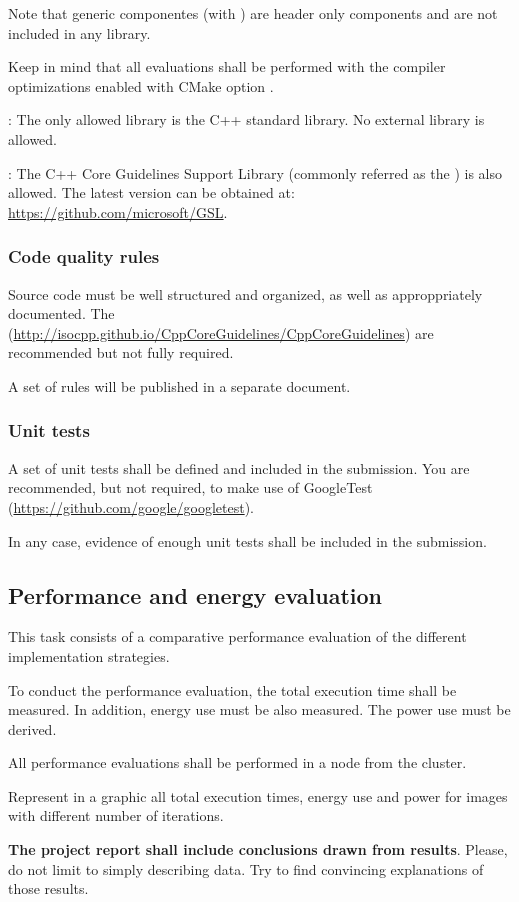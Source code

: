 Note that generic componentes (with ) are header only components and
are not included in any library.

Keep in mind that all evaluations shall be performed with the compiler optimizations
enabled with CMake option
.

: 
The only allowed library is the C++ standard library.
No external library is allowed.

: The C++ Core Guidelines Support Library (commonly referred as
the ) is also allowed. The latest version can be obtained at:
\url{https://github.com/microsoft/GSL}.

\subsubsection{Code quality rules}

Source code must be well structured and organized, 
as well as approppriately documented.
The 
(\url{http://isocpp.github.io/CppCoreGuidelines/CppCoreGuidelines})
are recommended but not fully required.

A set of rules will be published in a separate document.

\subsubsection{Unit tests}

A set of unit tests shall be defined and included in the submission.
You are recommended, but not required, to make use of GoogleTest
(\url{https://github.com/google/googletest}).

In any case, evidence of enough unit tests shall be included in the
submission.


\subsection{Performance and energy evaluation}

This task consists of a comparative performance evaluation of the 
different implementation strategies.

To conduct the performance evaluation, the total execution time shall be measured.
In addition, energy use must be also measured.
The power use must be derived.

All performance evaluations shall be performed in a node from the
 cluster.

Represent in a graphic all total execution times, energy use and power
for images with different number of iterations.

\textbf{The project report shall include conclusions drawn from results}.
Please, do not limit to simply describing data.
Try to find convincing explanations of those results.

